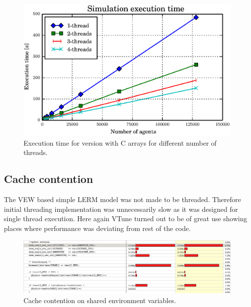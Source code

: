 \documentclass[12pt, a4paper]{report}
\begin{document}
\begin{figure}[H]
  \begin{center}
    \includegraphics[width=\columnwidth]{graphs/dict-array-multi-4-perf.eps}
    \caption{Execution time for version with C arrays for different number of threads.}
    \label{fig:dict-array-multi-4-perf}
  \end{center}
\end{figure}

\subsection{Cache contention}\label{subsec:cache-contention}
The VEW based simple LERM model was not made to be threaded. Therefore initial threading
implementation was unnecessarily slow as it was designed for single thread execution.
Here again VTune turned out to be of great use showing places where performance was
deviating from rest of the code.

\begin{figure}[H]
  \begin{center}
    \includegraphics[width=\textwidth,natwidth=1174,natheight=332]{images/cache-cont-before.png}
    \caption{Cache contention on shared environment variables.}
    \label{fig:cache-contention-before}
  \end{center}
\end{figure}
\end{document}
